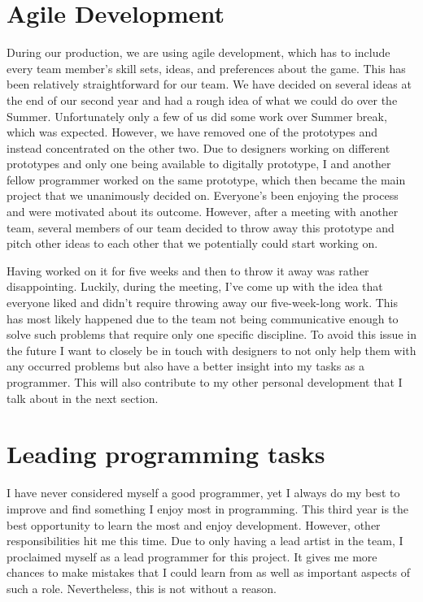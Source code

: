 \documentclass{scrartcl}
\begin{document}
\section{Agile Development}
During our production, we are using agile development, which has to include every team member's skill sets, ideas, and preferences about the game. This has been relatively straightforward for our team. We have decided on several ideas at the end of our second year and had a rough idea of what we could do over the Summer. Unfortunately only a few of us did some work over Summer break, which was expected. However, we have removed one of the prototypes and instead concentrated on the other two. Due to designers working on different prototypes and only one being available to digitally prototype, I and another fellow programmer worked on the same prototype, which then became the main project that we unanimously decided on. Everyone's been enjoying the process and were motivated about its outcome. However, after a meeting with another team, several members of our team decided to throw away this prototype and pitch other ideas to each other that we potentially could start working on. 

Having worked on it for five weeks and then to throw it away was rather disappointing. Luckily, during the meeting, I've come up with the idea that everyone liked and didn't require throwing away our five-week-long work. This has most likely happened due to the team not being communicative enough to solve such problems that require only one specific discipline. To avoid this issue in the future I want to closely be in touch with designers to not only help them with any occurred problems but also have a better insight into my tasks as a programmer. This will also contribute to my other personal development that I talk about in the next section.

\section{Leading programming tasks}
I have never considered myself a good programmer, yet I always do my best to improve and find something I enjoy most in programming. This third year is the best opportunity to learn the most and enjoy development. However, other responsibilities hit me this time. Due to only having a lead artist in the team, I proclaimed myself as a lead programmer for this project. It gives me more chances to make mistakes that I could learn from as well as important aspects of such a role. Nevertheless, this is not without a reason.
\end{document}
